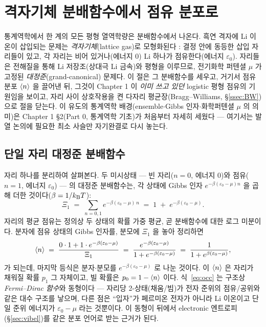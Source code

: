 \section{격자기체 분배함수에서 점유 분포로}\label{sec:partition}

통계역학에서 한 계의 모든 평형 열역학량은 분배함수에서 나온다. 흑연 격자에 Li 이온이 삽입되는 문제는
\emph{격자기체}(lattice gas)로 모형화된다 \cite{newman,huggins2009}: 결정 안에 동등한 삽입 자리들이 있고,
각 자리는 비어 있거나(에너지 $0$) Li 하나가 점유한다(에너지 $\varepsilon_0$). 자리들은 전해질을 통해 Li
저장조(상대극 Li 금속)와 평형을 이루므로, 전기화학 퍼텐셜 $\mu$ 가 고정된 \emph{대정준}(grand-canonical)
문제다. 이 절은 그 분배함수를 세우고, 거기서 점유 분포 $\langle n\rangle$ 을 끌어낸 뒤, 그것이 Chapter 1 이 \emph{이미
쓰고 있던} logistic 평형 점유의 기원임을 보이고, 자리 사이 상호작용을 켠 다자리 평균장(Bragg--Williams,
\S\ref{ssec:BW})으로 절을 닫는다. 이 유도의 통계역학 배경(ensemble$\cdot$Gibbs 인자$\cdot$화학퍼텐셜 $\mu$ 의
의미)은 Chapter 1 §2(Part 0, 통계역학 기초)가 처음부터 자세히 세웠다 --- 여기서는 발열 논의에 필요한 최소
사슬만 자기완결로 다시 놓는다.

\subsection{단일 자리 대정준 분배함수}\label{ssec:site}
자리 하나를 분리하여 살펴본다. 두 미시상태 --- 빈 자리($n=0$, 에너지 $0$)와 점유($n=1$, 에너지
$\varepsilon_0$) --- 의 대정준 분배함수는, 각 상태에 Gibbs 인자 $e^{-\beta(\varepsilon_0-\mu)n}$ 을 곱해 더한
것이다($\beta=1/k_{\mathrm B} T$):
\begin{equation}
\Xi_1 \;=\; \sum_{n=0,1} e^{-\beta(\varepsilon_0-\mu)\,n}
\;=\; 1 \;+\; e^{-\beta(\varepsilon_0-\mu)}.
\label{eq:Z1}
\end{equation}
자리의 평균 점유는 정의상 두 상태의 확률 가중 평균, 곧 분배함수에 대한 로그 미분이다. 분자에 점유 상태의
Gibbs 인자를, 분모에 $\Xi_1$ 을 놓아 정리하면
\begin{equation}
\langle n\rangle \;=\; \frac{0\cdot 1 + 1\cdot e^{-\beta(\varepsilon_0-\mu)}}{\Xi_1}
\;=\; \frac{e^{-\beta(\varepsilon_0-\mu)}}{1+e^{-\beta(\varepsilon_0-\mu)}}
\;=\; \frac{1}{1+e^{\beta(\varepsilon_0-\mu)}},
\label{eq:occ}
\end{equation}
가 되는데, 마지막 등식은 분자$\cdot$분모를 $e^{-\beta(\varepsilon_0-\mu)}$ 로 나눈 것이다. 이 $\langle n\rangle$ 은 자리가
채워질 확률 $p_1$ 그 자체이고, 빌 확률은 $p_0=1-\langle n\rangle$ 이다. 식~\eqref{eq:occ} 는 구조상 \emph{Fermi--Dirac
함수}와 동형이다 --- 자리당 2-상태(채움/빔)가 전자 준위의 점유/공위와 같은 대수 구조를 낳으며, 다른 점은
``입자''가 페르미온 전자가 아니라 Li 이온이고 단일 준위 에너지가 $\varepsilon_0-\mu$ 라는 것뿐이다. 이 동형이
뒤에서 electronic 엔트로피(\S\ref{sec:vibel})를 같은 분포 언어로 받는 근거가 된다.


